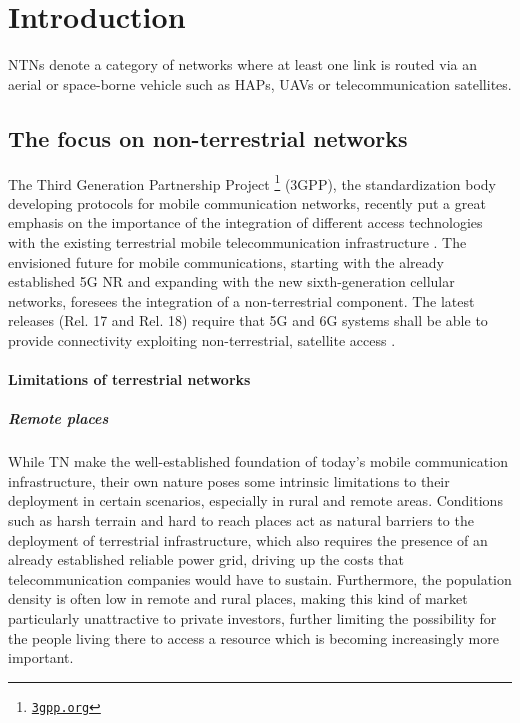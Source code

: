
\chapter{Introduction}
\label{chp:intro}

\ac{NTNs} denote a category of networks where at least one link is routed via an aerial or space-borne vehicle such as \ac{HAPs}, \ac{UAVs} or telecommunication satellites.

\section{The focus on non-terrestrial networks}
The Third Generation Partnership Project \footnote{\href{https://www.3gpp.org}{\texttt{3gpp.org}}} (3GPP), the standardization body developing protocols for mobile communication networks, recently put a great emphasis on the importance of the integration of different access technologies with the existing terrestrial mobile telecommunication infrastructure \cite{3gpp-tr-21.917}. The envisioned future for mobile communications, starting with the already established 5G \ac{NR} and expanding with the new sixth-generation cellular networks, foresees the integration of a non-terrestrial component. The latest releases (Rel. 17 and Rel. 18) require that 5G and 6G systems shall be able to provide connectivity exploiting non-terrestrial, satellite access \cite{overview-rel-17-18-saad} \cite{5g-nr-communication-geo-leo-maattanen}.

\subsubsection{Limitations of terrestrial networks}
\paragraph{Remote places}
While \ac{TN} make the well-established foundation of today’s mobile communication infrastructure, their own nature poses some intrinsic limitations to their deployment in certain scenarios, especially in rural and remote areas. Conditions such as harsh terrain and hard to reach places act as natural barriers to the deployment of terrestrial infrastructure, which also requires the presence of an already established reliable power grid, driving up the costs that telecommunication companies would have to sustain.
Furthermore, the population density is often low in remote and rural places, making this kind of market particularly unattractive to private investors, further limiting the possibility for the people living there to access a resource which is becoming increasingly more important.


